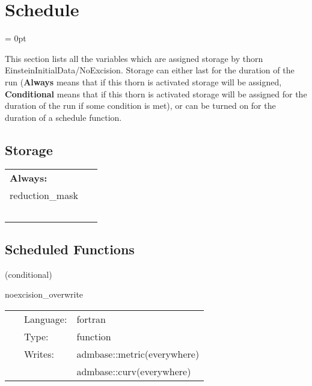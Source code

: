 
\section{Schedule} 


\parskip = 0pt


\noindent This section lists all the variables which are assigned storage by thorn EinsteinInitialData/NoExcision.  Storage can either last for the duration of the run ({\bf Always} means that if this thorn is activated storage will be assigned, {\bf Conditional} means that if this thorn is activated storage will be assigned for the duration of the run if some condition is met), or can be turned on for the duration of a schedule function.


\subsection*{Storage}

\hspace{5mm}

 \begin{tabular*}{160mm}{ll} 

{\bf Always:}&  ~ \\ 
 reduction\_mask & ~\\ 
~ & ~\\ 
\end{tabular*} 


\subsection*{Scheduled Functions}
\vspace{5mm}

   (conditional) 

\hspace{5mm} noexcision\_overwrite 

\hspace{5mm}{\it overwrite regions with minkowski } 


\hspace{5mm}

 \begin{tabular*}{160mm}{cll} 
~ & Language:  & fortran \\ 
~ & Type:  & function \\ 
~ & Writes:  & admbase::metric(everywhere) \\ 
~& ~ &admbase::curv(everywhere)\\ 
\end{tabular*} 


